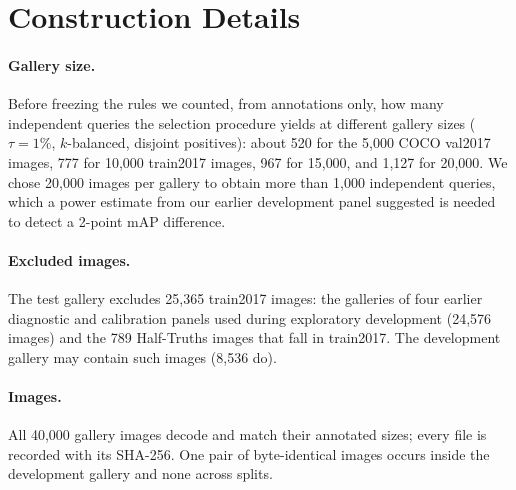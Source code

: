 \section{\bench{} Construction Details}
\label{app:benchmark}

\paragraph{Gallery size.}
Before freezing the rules we counted, from annotations only, how many independent queries the selection procedure yields at different gallery sizes ($\tau{=}1\%$, $k$-balanced, disjoint positives):
about 520 for the 5{,}000 COCO val2017 images, 777 for 10{,}000 train2017 images, 967 for 15{,}000, and 1{,}127 for 20{,}000.
We chose 20{,}000 images per gallery to obtain more than 1{,}000 independent queries, which a power estimate from our earlier development panel suggested is needed to detect a 2-point mAP difference.

\paragraph{Excluded images.}
The test gallery excludes 25{,}365 train2017 images: the galleries of four earlier diagnostic and calibration panels used during exploratory development (24{,}576 images) and the 789 Half-Truths images that fall in train2017.
The development gallery may contain such images (8{,}536 do).

\paragraph{Images.}
All 40{,}000 gallery images decode and match their annotated sizes; every file is recorded with its SHA-256.
One pair of byte-identical images occurs inside the development gallery and none across splits.
